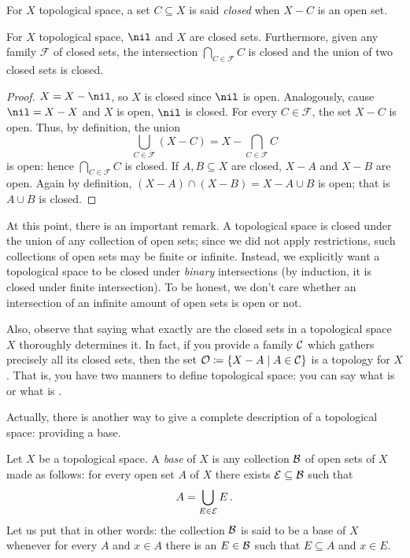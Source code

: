 \begin{definition}
For \(X\) topological space, a set \(C \subseteq X\) is said {\em closed} when \(X-C\) is an open set.
\end{definition}

\begin{theorem}
For \(X\) topological space, \(\nil\) and \(X\) are closed sets. Furthermore, given any family \(\mathcal F\) of closed sets, the intersection \(\bigcap_{C \in \mathcal F} C\) is closed and the union of two closed sets is closed.
\end{theorem}

\begin{proof}
\(X = X - \nil\), so \(X\) is closed since \(\nil\) is open. Analogously, cause \(\nil = X - X\) and \(X\) is open, \(\nil\) is closed.\newline
For every \(C \in \mathcal F\), the set \(X - C\) is open. Thus, by definition, the union
\[\bigcup_{C \in \mathcal F} (X -C) = X - \bigcap_{C \in \mathcal F} C\]
is open: hence \(\bigcap_{C \in \mathcal F} C\) is closed.\newline
If \(A, B \subseteq X\) are closed, \(X-A\) and \(X-B\) are open. Again by definition,
\((X-A) \cap (X-B) = X - A \cup B\)
is open; that is \(A \cup B\) is closed.
\end{proof}

At this point, there is an important remark. A topological space is closed under the union of any collection of open sets; since we did not apply restrictions, such collections of open sets may be finite or infinite. Instead, we explicitly want a topological space to be closed under {\em binary} intersections (by induction, it is closed under finite intersection). To be honest, we don't care whether an intersection of an infinite amount of open sets is open or not.

Also, observe that saying what exactly are the closed sets in a topological space \(X\) thoroughly determines it. In fact, if you provide a family \(\mathcal C\) which gathers precisely all its closed sets, then the set \(\mathcal O \coloneq \left\{X - A \mid A \in \mathcal C\right\}\) is a topology for \(X\). That is, you have two manners to define topological space: you can say what is  or what is .

Actually, there is another way to give a complete description of a topological space: providing a base.

\begin{definition}\label{definition:DefBase}
Let \(X\) be a topological space. A {\em base} of \(X\) is any collection \(\mathcal B\) of open sets of \(X\) made as follows: for every open set \(A\) of \(X\) there exists \(\mathcal E \subseteq \mathcal B\) such that
\[A = \bigcup_{E \in \mathcal E} E\,.\] 
Let us put that in other words: the collection \(\mathcal B\) is said to be a base of \(X\) whenever for every \(A\) and \(x \in A\) there is an \(E \in \mathcal B\) such that \(E \subseteq A\) and \(x \in E\). 
\end{definition}

